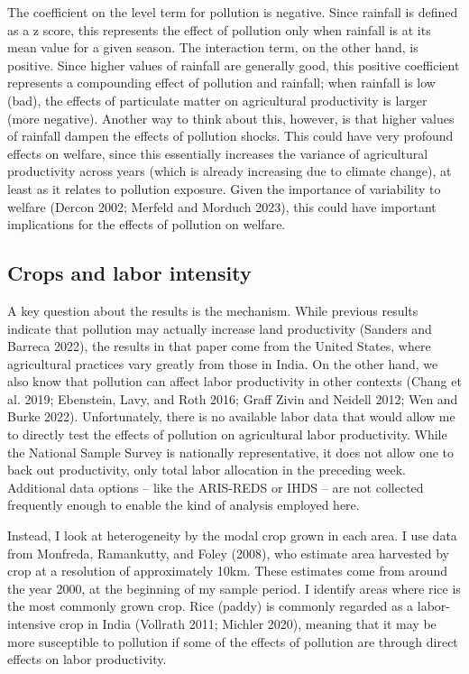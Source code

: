\documentclass[
]{article}
\begin{document}
The coefficient on the level term for pollution is negative. Since rainfall is defined as a z score, this represents the effect of pollution only when rainfall is at its mean value for a given season. The interaction term, on the other hand, is positive. Since higher values of rainfall are generally good, this positive coefficient represents a compounding effect of pollution and rainfall; when rainfall is low (bad), the effects of particulate matter on agricultural productivity is larger (more negative). Another way to think about this, however, is that higher values of rainfall dampen the effects of pollution shocks. This could have very profound effects on welfare, since this essentially increases the variance of agricultural productivity across years (which is already increasing due to climate change), at least as it relates to pollution exposure. Given the importance of variability to welfare (Dercon 2002; Merfeld and Morduch 2023), this could have important implications for the effects of pollution on welfare.

\hypertarget{crops-and-labor-intensity}{%
\subsection{Crops and labor intensity}\label{crops-and-labor-intensity}}

A key question about the results is the mechanism. While previous results indicate that pollution may actually increase land productivity (Sanders and Barreca 2022), the results in that paper come from the United States, where agricultural practices vary greatly from those in India. On the other hand, we also know that pollution can affect labor productivity in other contexts (Chang et al. 2019; Ebenstein, Lavy, and Roth 2016; Graff Zivin and Neidell 2012; Wen and Burke 2022). Unfortunately, there is no available labor data that would allow me to directly test the effects of pollution on agricultural labor productivity. While the National Sample Survey is nationally representative, it does not allow one to back out productivity, only total labor allocation in the preceding week. Additional data options -- like the ARIS-REDS or IHDS -- are not collected frequently enough to enable the kind of analysis employed here.

Instead, I look at heterogeneity by the modal crop grown in each area. I use data from Monfreda, Ramankutty, and Foley (2008), who estimate area harvested by crop at a resolution of approximately 10km. These estimates come from around the year 2000, at the beginning of my sample period. I identify areas where rice is the most commonly grown crop. Rice (paddy) is commonly regarded as a labor-intensive crop in India (Vollrath 2011; Michler 2020), meaning that it may be more susceptible to pollution if some of the effects of pollution are through direct effects on labor productivity.
\end{document}
